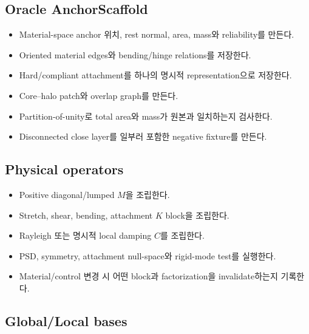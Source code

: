 \documentclass[10pt,a4paper]{article}
\newcommand{\todo}{\textcolor{TodoGray}{\(\square\)}}
\begin{document}
\subsection*{Oracle AnchorScaffold}

\begin{itemize}
  \item[\todo] Material-space anchor 위치, rest normal, area, mass와 reliability를 만든다.
  \item[\todo] Oriented material edges와 bending/hinge relations를 저장한다.
  \item[\todo] Hard/compliant attachment를 하나의 명시적 representation으로 저장한다.
  \item[\todo] Core--halo patch와 overlap graph를 만든다.
  \item[\todo] Partition-of-unity로 total area와 mass가 원본과 일치하는지 검사한다.
  \item[\todo] Disconnected close layer를 일부러 포함한 negative fixture를 만든다.
\end{itemize}

\subsection*{Physical operators}

\begin{itemize}
  \item[\todo] Positive diagonal/lumped \(M\)을 조립한다.
  \item[\todo] Stretch, shear, bending, attachment \(K\) block을 조립한다.
  \item[\todo] Rayleigh 또는 명시적 local damping \(C\)를 조립한다.
  \item[\todo] PSD, symmetry, attachment null-space와 rigid-mode test를 실행한다.
  \item[\todo] Material/control 변경 시 어떤 block과 factorization을 invalidate하는지 기록한다.
\end{itemize}

\subsection*{Global/Local bases}
\end{document}
